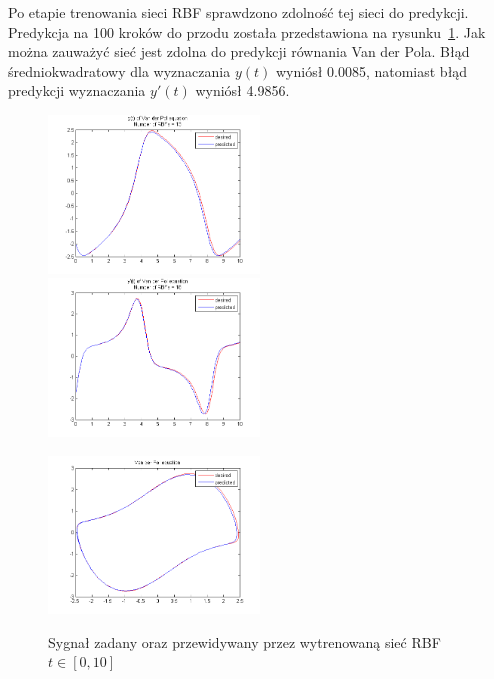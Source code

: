 \clearpage

Po etapie trenowania sieci RBF sprawdzono zdolność tej sieci do predykcji. Predykcja na 100 kroków do przodu została przedstawiona na rysunku~\ref{img:predicted}. Jak można zauważyć sieć jest zdolna do predykcji równania Van der Pola. Błąd średniokwadratowy dla wyznaczania $y(t)$ wyniósł 0.0085, natomiast błąd predykcji wyznaczania $y'(t)$ wyniósł  4.9856.

\begin{figure}[ht!]
	\centering

	\subfloat
	{\includegraphics[width=0.5\textwidth]
	{images/signal_pred100.png}}
	\subfloat
	{\includegraphics[width=0.5\textwidth]
	{images/deriv_pred100.png}}	
	
	\subfloat
	{\includegraphics[width=0.5\textwidth]
	{images/trajectory_pred100.png}}

	\caption{Sygnał zadany oraz przewidywany przez wytrenowaną sieć RBF $t \in [0,10]$}
	\label{img:predicted}
\end{figure}



